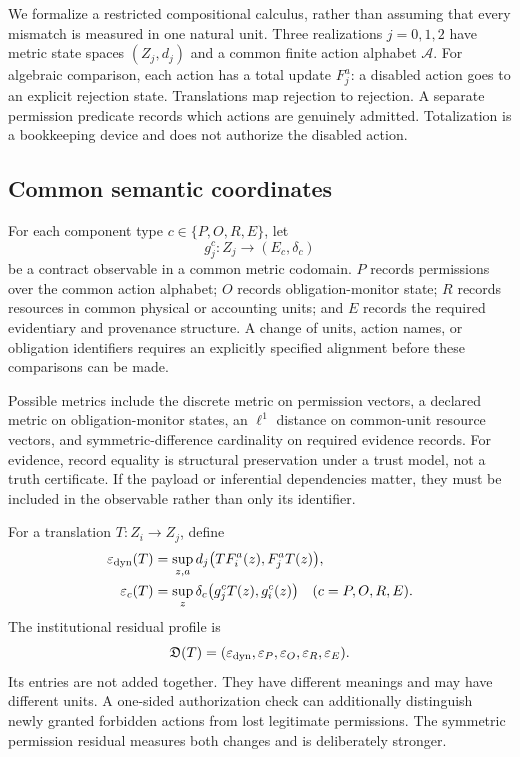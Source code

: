 \documentclass[11pt,letterpaper]{article}
\theoremstyle{plain}
\theoremstyle{definition}
\theoremstyle{remark}
\begin{document}
We formalize a restricted compositional calculus, rather than assuming that every mismatch is measured in one natural unit. Three realizations $j=0,1,2$ have metric state spaces $(Z_j,d_j)$ and a common finite action alphabet $\mathcal A$. For algebraic comparison, each action has a total update $F_j^a$: a disabled action goes to an explicit rejection state. Translations map rejection to rejection. A separate permission predicate records which actions are genuinely admitted. Totalization is a bookkeeping device and does not authorize the disabled action.

\subsection{Common semantic coordinates}
For each component type $c\in\{P,O,R,E\}$, let
\[
g_j^c:Z_j\longrightarrow(E_c,\delta_c)
\]
be a contract observable in a common metric codomain. $P$ records permissions over the common action alphabet; $O$ records obligation-monitor state; $R$ records resources in common physical or accounting units; and $E$ records the required evidentiary and provenance structure. A change of units, action names, or obligation identifiers requires an explicitly specified alignment before these comparisons can be made.

Possible metrics include the discrete metric on permission vectors, a declared metric on obligation-monitor states, an $\ell^1$ distance on common-unit resource vectors, and symmetric-difference cardinality on required evidence records. For evidence, record equality is structural preservation under a trust model, not a truth certificate. If the payload or inferential dependencies matter, they must be included in the observable rather than only its identifier.

For a translation $T:Z_i\to Z_j$, define
\[
\begin{split}
\varepsilon_{\rm dyn}(T)
 &=\sup_{z,a}d_j\bigl(TF_i^a(z),F_j^aT(z)\bigr),\\
\varepsilon_c(T)
 &=\sup_z\delta_c\bigl(g_j^cT(z),g_i^c(z)\bigr)
 \quad(c=P,O,R,E).
\end{split}
\]
The institutional residual profile is
\[
\mathfrak D(T)=
(\varepsilon_{\rm dyn},\varepsilon_P,\varepsilon_O,
\varepsilon_R,\varepsilon_E).
\]
Its entries are not added together. They have different meanings and may have different units. A one-sided authorization check can additionally distinguish newly granted forbidden actions from lost legitimate permissions. The symmetric permission residual measures both changes and is deliberately stronger.
\end{document}
